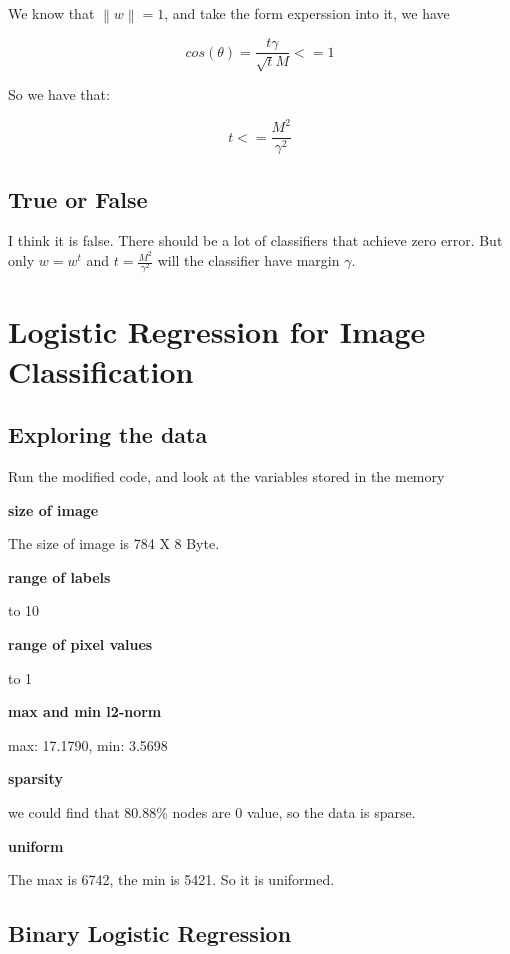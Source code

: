 \documentclass{article} %
\newcommand{\norm}[1]{\left\lVert #1 \right\rVert}
\begin{document}
We know that $\norm{w} = 1$, and take the form experssion into it, we have

\begin{equation}
cos(\theta) = \frac{t \gamma}{\sqrt{t} M} <= 1
\end{equation}

So we have that:

\begin{equation}
t <= \frac{M^2}{\gamma^2}
\end{equation}


\subsection{True or False}
I think it is false. There should be a lot of classifiers that achieve zero
error. But only $w = w^t$ and $t=\frac{M^2}{\gamma^2}$ will the classifier have
margin $\gamma$.



\section{Logistic Regression for Image Classification}


\subsection{Exploring the data}

Run the modified code, and look at the variables stored in the memory

\textbf{size of image}

\qquad The size of image is 784 X 8 Byte.

\textbf{range of labels}

 to 10

\textbf{range of pixel values}

 to 1

\textbf{max and min l2-norm}

\qquad max: 17.1790, min: 3.5698

\textbf{sparsity}

\qquad we could find that 80.88\% nodes are 0 value, so the data is sparse.

\textbf{uniform}

\qquad The max is 6742, the min is 5421. So it is uniformed.

\subsection{Binary Logistic Regression}
\end{document}
